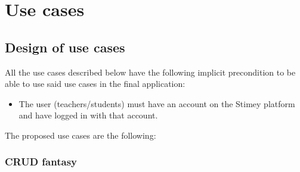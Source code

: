 \chapter{Use cases}
\section{Design of use cases}
All the use cases described below have the following implicit precondition to be able to use said use cases in the final application:
\begin{itemize}
	\item The user (teachers/students) must have an account on the Stimey platform and have logged in with that account.
\end{itemize}

The proposed use cases are the following:

\subsection{CRUD fantasy}
\hypertarget{crearfantasia}{}
